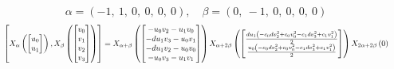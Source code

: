 \documentclass[11pt]{article}
\theoremstyle{definition}
\begin{document}
\[
\alpha = \left( -1, \  1, \  0, \  0, \  0, \  0\right), \quad \beta = \left( 0, \  -1, \  0, \  0, \  0, \  0\right)
\]
\[
\scaletoalign{\textwidth}{\left[ X_{\alpha}\left(\left[\begin{matrix}u_{0}\\u_{1}\end{matrix}\right]\right), X_{\beta}\left(\left[\begin{matrix}v_{0}\\v_{1}\\v_{2}\\v_{3}\end{matrix}\right]\right) \right] = X_{\alpha + \beta}\left(\left[\begin{matrix}- u_{0} v_{2} - u_{1} v_{0}\\- d u_{1} v_{3} - u_{0} v_{1}\\- d u_{1} v_{2} - u_{0} v_{0}\\- u_{0} v_{3} - u_{1} v_{1}\end{matrix}\right]\right) X_{\alpha + 2\beta}\left(\left[\begin{matrix}\frac{d u_{1} \left(- c_{0} d v_{2}^{2} + c_{0} v_{0}^{2} - c_{1} d v_{3}^{2} + c_{1} v_{1}^{2}\right)}{2}\\\frac{u_{0} \left(- c_{0} d v_{2}^{2} + c_{0} v_{0}^{2} - c_{1} d v_{3}^{2} + c_{1} v_{1}^{2}\right)}{2}\end{matrix}\right]\right) X_{2\alpha + 2\beta}\left(0\right)}
\]
\end{document}
